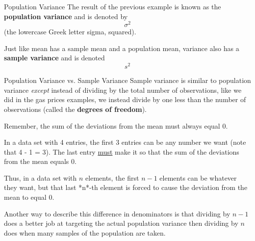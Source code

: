 \documentclass[t]{beamer}
\begin{document}
\begin{frame}{Population Variance}
The result of the previous example is known as the {\color{blue}\textbf{population variance}} and is denoted by \[\sigma^2\] 
(the lowercase Greek letter sigma, squared).	\newline\\	\pause

Just like mean has a sample mean and a population mean, variance also has a {\color{red}\textbf{sample variance}} and is denoted \[s^2\]
\end{frame}

\begin{frame}{Population Variance vs. Sample Variance}
Sample variance is similar to population variance \emph{except} instead of dividing by the total number of observations, like we did in the gas prices examples, we instead divide by one less than the number of observations (called the {\color{blue}\textbf{degrees of freedom}}).	\newline\\	\pause

Remember, the sum of the deviations from the mean must always equal 0. \newline\\	\pause

In a data set with 4 entries, the first 3 entries can be any number we want (note that 4 - 1 = 3). The last entry \underline{must} make it so that the sum of the deviations from the mean equals 0.	\newline\\	\pause

Thus, in a data set with $n$ elements, the first $n-1$ elements can be whatever they want, but that last *n*-th element is forced to cause the deviation from the mean to equal 0.	\newline\\	\pause

Another way to describe this difference in denominators is that dividing by $n-1$ does a better job at targeting the actual population variance then dividing by $n$ does when many samples of the population are taken.
\end{frame}
\end{document}
